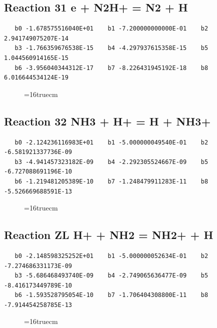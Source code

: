 \documentclass[12pt,dvipdfm]{article}
\begin{document}
\subsection{
Reaction 31 e + N2H+ = N2 + H}
\begin{small}\begin{verbatim}
   b0 -1.678575516040E+01    b1 -7.200000000000E-01    b2  2.941749075207E-14
   b3 -1.766359676538E-15    b4 -4.297937615358E-15    b5  1.044560914165E-15
   b6 -3.956040344312E-17    b7 -8.226431945192E-18    b8  6.016644534124E-19
   \end{verbatim}\end{small}
\begin{figure}[h!]
\label{n2rates}
\epsfxsize=16truecm
\end{figure}
\newpage

\subsection{
Reaction 32 NH3 + H+ = H + NH3+}
\begin{small}\begin{verbatim}
   b0 -2.124236116983E+01    b1 -5.000000049540E-01    b2 -6.581921337736E-09
   b3 -4.941457323182E-09    b4 -2.292305524667E-09    b5 -6.727088691196E-10
   b6 -1.219481205389E-10    b7 -1.248479911283E-11    b8 -5.526669688591E-13
   \end{verbatim}\end{small}
\begin{figure}[h!]
\label{n2rates}
\epsfxsize=16truecm
\end{figure}
\newpage

\subsection{
Reaction ZL H+ + NH2 = NH2+ + H}
\begin{small}\begin{verbatim}
   b0 -2.148598325252E+01    b1 -5.000000052634E-01    b2 -7.274686331173E-09
   b3 -5.686468493740E-09    b4 -2.749065636477E-09    b5 -8.416173449789E-10
   b6 -1.593528795054E-10    b7 -1.706404308800E-11    b8 -7.914454258785E-13
   \end{verbatim}\end{small}
\begin{figure}[h!]
\label{n2rates}
\epsfxsize=16truecm
\end{figure}
\newpage
\end{document}
